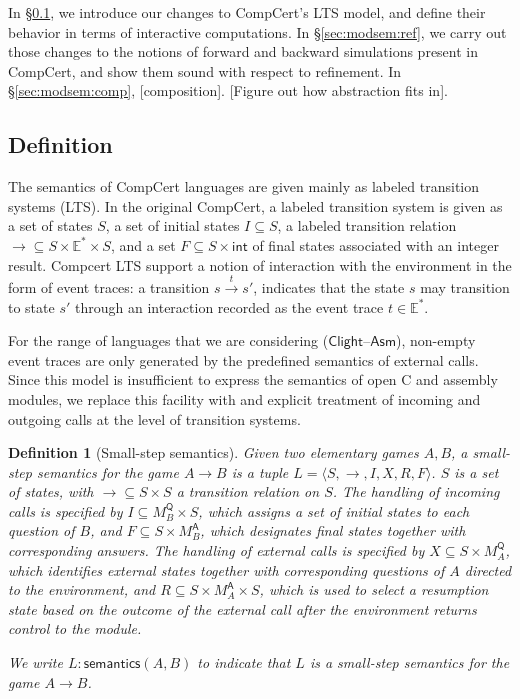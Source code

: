 \documentclass{article}
\newtheorem{definition}{Definition}
\newcommand{\kw}[1]{\ensuremath{ \mathsf{#1} }}
\begin{document}
In \S\ref{sec:modsem:def},
we introduce our changes to CompCert's LTS model,
and define their behavior in terms of interactive computations.
In \S\ref{sec:modsem:ref},
we carry out those changes to the notions of
forward and backward simulations
present in CompCert,
and show them sound with respect to refinement.
In \S\ref{sec:modsem:comp},
[composition].
[Figure out how abstraction fits in].


\subsection{Definition} %
\label{sec:modsem:def}

The semantics of CompCert languages are given mainly
as labeled transition systems (LTS).
In the original CompCert,
a labeled transition system is given as
a set of states $S$,
a set of initial states
$I \subseteq S$,
a labeled transition relation
${\rightarrow} \subseteq S \times \mathbb{E}^* \times S$,
and a set
$F \subseteq S \times \kw{int}$
of final states associated with an integer result.
Compcert LTS support a notion of interaction with the environment
in the form of event traces:
a transition $s \stackrel{t}{\rightarrow} s'$,
indicates that the state $s$ may transition to state $s'$
through an interaction recorded as the event trace $t \in \mathbb{E}^*$.

For the range of languages that we are considering
($\kw{Clight}$--$\kw{Asm}$),
non-empty event traces are only generated by
the predefined semantics of external calls.
Since this model is insufficient to express
the semantics of open C and assembly modules,
we replace this facility with
and explicit treatment of incoming and outgoing calls
at the level of transition systems.

\begin{definition}[Small-step semantics]
Given two elementary games $A, B$,
a \emph{small-step semantics} for the game $A \rightarrow B$
is a tuple $L = \langle S, \rightarrow, I, X, R, F \rangle$.
$S$ is a set of states,
with ${\rightarrow} \subseteq S \times S$ a \emph{transition relation} on $S$.
The handling of incoming calls is specified by
$I \subseteq M_B^\kw{Q} \times S$, which
assigns a set of \emph{initial states} to each question of $B$, and
$F \subseteq S \times M_B^\kw{A}$,
which designates \emph{final states} together with corresponding answers.
The handling of external calls is specified by
$X \subseteq S \times M_A^\kw{Q}$,
which identifies \emph{external states} together with
corresponding questions of $A$ directed to the environment, and
$R \subseteq S \times M_A^\kw{A} \times S$,
which is used to select a \emph{resumption state}
based on the outcome of the external call
after the environment returns control to the module.

We write $L : \kw{semantics}(A, B)$ to indicate that
$L$ is a small-step semantics for the game $A \rightarrow B$.
\end{definition}
\end{document}
